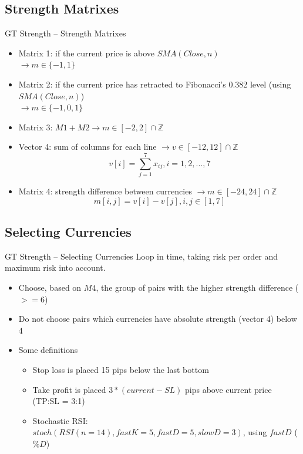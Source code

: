 \documentclass[12pt,portuguese]{beamer}
\begin{document}
\subsection{Strength Matrixes}
\begin{frame}{GT Strength -- Strength Matrixes}
\footnotesize
\begin{itemize}
	\item Matrix 1: if the current price is above $SMA(Close, n)$ \\ $\rightarrow m \in \{-1,1\}$
	\item Matrix 2: if the current price has retracted to Fibonacci's 0.382 level (using $SMA(Close, n)$)\\ $\rightarrow m \in \{-1,0,1\}$
	\item Matrix 3: $M1 + M2 \rightarrow m \in [-2,2] \cap \mathbb{Z}$
	\item Vector 4: sum of columns for each line $\rightarrow v \in [-12,12] \cap \mathbb{Z}$
		$$v[i] = \sum_{j=1}^7 x_{ij}, i=1,2, ..., 7$$
	\item Matrix 4: strength difference between currencies $\rightarrow m \in [-24,24] \cap \mathbb{Z}$
		$$m[i,j] = v[i] - v[j], i,j \in [1,7]$$
\end{itemize}
\end{frame}

\subsection{Selecting Currencies}
\begin{frame}{GT Strength -- Selecting Currencies}
	Loop in time, taking risk per order and maximum risk into account.
\begin{itemize}
	\item Choose, based on $M4$, the group of pairs with the higher strength difference ($>= 6$)
	\item Do not choose pairs which currencies have absolute strength (vector 4) below 4
	\item Some definitions
		\begin{itemize}
			\item Stop loss is placed 15 pips below the last bottom
			\item Take profit is placed $3*(current-SL)$ pips above current price (TP:SL = 3:1)
			\item Stochastic RSI: $stoch(RSI(n=14), fastK=5, fastD=5, slowD=3)$, using $fastD$ ($\%D$)
		\end{itemize}
\end{itemize}
\end{frame}
\end{document}
